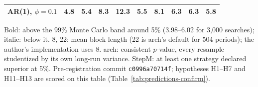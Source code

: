 \begin{table}[t]
\begin{tabular}{lrrrrrrrrr}
AR(1), $\phi=0.1$ & 4.8 & 5.4 & \textbf{8.3} & \textbf{12.3} & 5.5 & \textbf{8.1} & \textbf{6.3} & \textbf{6.3} & 5.8 \\
\bottomrule
\end{tabular}
\par\smallskip\begin{minipage}{0.97\linewidth}\footnotesize Bold: above the 99\% Monte Carlo band around 5\% (3.98--6.02 for 3{,}000 searches); italic: below it. 8, 22: mean block length (22 is arch's default for 504 periods); the author's implementation uses 8. arch: consistent $p$-value, every resample studentized by its own long-run variance. StepM: at least one strategy declared superior at 5\%. Pre-registration commit \texttt{c0996a70714f}; hypotheses H1--H7 and H11--H13 are scored on this table (Table~\ref{tab:predictions-confirm}).\end{minipage}
\end{table}

